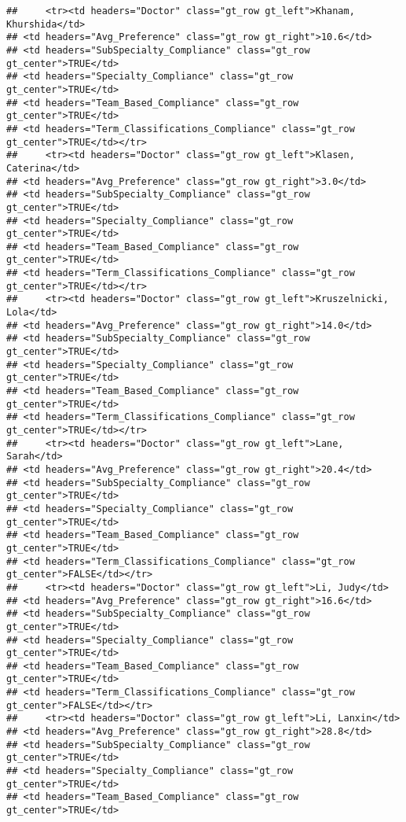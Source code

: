 \documentclass[
]{article}
\begin{document}
\begin{verbatim}
##     <tr><td headers="Doctor" class="gt_row gt_left">Khanam, Khurshida</td>
## <td headers="Avg_Preference" class="gt_row gt_right">10.6</td>
## <td headers="SubSpecialty_Compliance" class="gt_row gt_center">TRUE</td>
## <td headers="Specialty_Compliance" class="gt_row gt_center">TRUE</td>
## <td headers="Team_Based_Compliance" class="gt_row gt_center">TRUE</td>
## <td headers="Term_Classifications_Compliance" class="gt_row gt_center">TRUE</td></tr>
##     <tr><td headers="Doctor" class="gt_row gt_left">Klasen, Caterina</td>
## <td headers="Avg_Preference" class="gt_row gt_right">3.0</td>
## <td headers="SubSpecialty_Compliance" class="gt_row gt_center">TRUE</td>
## <td headers="Specialty_Compliance" class="gt_row gt_center">TRUE</td>
## <td headers="Team_Based_Compliance" class="gt_row gt_center">TRUE</td>
## <td headers="Term_Classifications_Compliance" class="gt_row gt_center">TRUE</td></tr>
##     <tr><td headers="Doctor" class="gt_row gt_left">Kruszelnicki, Lola</td>
## <td headers="Avg_Preference" class="gt_row gt_right">14.0</td>
## <td headers="SubSpecialty_Compliance" class="gt_row gt_center">TRUE</td>
## <td headers="Specialty_Compliance" class="gt_row gt_center">TRUE</td>
## <td headers="Team_Based_Compliance" class="gt_row gt_center">TRUE</td>
## <td headers="Term_Classifications_Compliance" class="gt_row gt_center">TRUE</td></tr>
##     <tr><td headers="Doctor" class="gt_row gt_left">Lane, Sarah</td>
## <td headers="Avg_Preference" class="gt_row gt_right">20.4</td>
## <td headers="SubSpecialty_Compliance" class="gt_row gt_center">TRUE</td>
## <td headers="Specialty_Compliance" class="gt_row gt_center">TRUE</td>
## <td headers="Team_Based_Compliance" class="gt_row gt_center">TRUE</td>
## <td headers="Term_Classifications_Compliance" class="gt_row gt_center">FALSE</td></tr>
##     <tr><td headers="Doctor" class="gt_row gt_left">Li, Judy</td>
## <td headers="Avg_Preference" class="gt_row gt_right">16.6</td>
## <td headers="SubSpecialty_Compliance" class="gt_row gt_center">TRUE</td>
## <td headers="Specialty_Compliance" class="gt_row gt_center">TRUE</td>
## <td headers="Team_Based_Compliance" class="gt_row gt_center">TRUE</td>
## <td headers="Term_Classifications_Compliance" class="gt_row gt_center">FALSE</td></tr>
##     <tr><td headers="Doctor" class="gt_row gt_left">Li, Lanxin</td>
## <td headers="Avg_Preference" class="gt_row gt_right">28.8</td>
## <td headers="SubSpecialty_Compliance" class="gt_row gt_center">TRUE</td>
## <td headers="Specialty_Compliance" class="gt_row gt_center">TRUE</td>
## <td headers="Team_Based_Compliance" class="gt_row gt_center">TRUE</td>

\end{verbatim}
\end{document}
